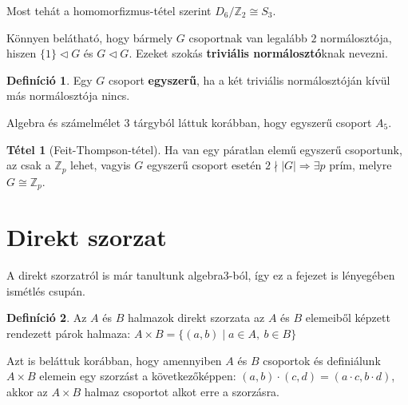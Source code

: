 \documentclass[12pt]{book}
\theoremstyle{plain} %
\theoremstyle{definition} %
\newtheorem{defi/}{Definíció}[section]
\newenvironment{defi}
  {\renewcommand{\qedsymbol}{$\clubsuit$}%
   \pushQED{\qed}\begin{defi/}}
  {\popQED\end{defi/}}
\newtheorem{theo/}{Tétel}[section]
\newenvironment{theo}
  {\renewcommand{\qedsymbol}{$\clubsuit$}%
   \pushQED{\qed}\begin{theo/}}
  {\popQED\end{theo/}}
\theoremstyle{remark}
\renewcommand\qedsymbol{$\blacksquare$}
\numberwithin{equation}{section}  %
\def\Z{\mathbb{Z}}
\begin{document}
	Most tehát a homomorfizmus-tétel szerint $D_6/\Z_2 \cong S_3$.

	Könnyen belátható, hogy bármely $G$ csoportnak van legalább $2$ normálosztója, hiszen $\{1\} \triangleleft G$ és $G \triangleleft G$. Ezeket szokás \textbf{triviális normálosztó}knak nevezni.
	
	\begin{defi}
		Egy $G$ csoport \textbf{egyszerű}, ha a két triviális normálosztóján kívül más normálosztója nincs.
	\end{defi}

	Algebra és számelmélet 3 tárgyból láttuk korábban, hogy egyszerű csoport $A_5$.

	\begin{theo}[Feit-Thompson-tétel]
		Ha van egy páratlan elemű egyszerű csoportunk, az csak a $\Z_p$ lehet, vagyis $G$ egyszerű csoport esetén $2\nmid |G| \Rightarrow \exists p$ prím, melyre $G\cong \Z_p$.
	\end{theo}
	
	
	
	\section{Direkt szorzat}
	
	A direkt szorzatról is már tanultunk algebra3-ból, így ez a fejezet is lényegében ismétlés csupán.
	
	\begin{defi}
		Az $A$ és $B$ halmazok direkt szorzata az $A$ és $B$ elemeiből képzett rendezett párok halmaza: $A\times B = \{ (a,b) \mid a\in A,\ b\in B \}$
	\end{defi}

	Azt is beláttuk korábban, hogy amennyiben $A$ és $B$ csoportok és definiálunk $A\times B$ elemein egy szorzást a következőképpen: $(a,b) \cdot (c,d) = (a\cdot c, b\cdot d)$, akkor az $A\times B$ halmaz csoportot alkot erre a szorzásra.
	
\end{document}
